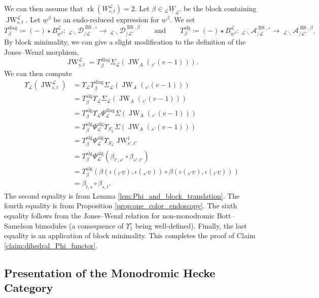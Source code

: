 \documentclass{amsart}
\newcommand{\scrL}{\mathcal{L}}
\DeclareMathOperator{\rk}{rk}
\DeclareMathOperator{\diag}{diag}
\DeclareMathOperator{\alg}{alg}
\DeclareMathOperator{\BS}{BS}
\DeclareMathOperator{\JW}{JW}
\newcommand{\EWmon}[2]{\:_{#1 \backslash} \mathcal{D}_{/ #2} }
\newcommand{\Amon}[2]{\:_{#1 \backslash} \mathcal{A}_{/ #2} }
\newcommand{\uW}[2]{{}_{#1}\underline{W}_{#2}}
\newcommand{\uw}{\underline{w}}
\theoremstyle{definition}
\numberwithin{equation}{subsection}
\begin{document}
We can then assume that $\rk (W_{s,t}^{\scrL}) = 2$. 
Let $\beta \in \uW{\scrL}{\scrL'}$ be the block containing $\JW_{s,t}^{\scrL}$.
Let $\uw^{\beta}$ be an endo-reduced expression for $w^{\beta}$. We set 
\[ T_{\beta}^{\diag} \coloneq (-) \star B_{\uw^{\beta}}^{\scrL} : \EWmon{\scrL}{\scrL}^{\BS, \circ} \to \EWmon{\scrL}{\scrL'}^{\BS, \beta} \qquad\text{and}\qquad T_{\beta}^{\alg} \coloneq (-) \star B_{\uw^{\beta}}^{\scrL} : \Amon{\scrL}{\scrL}^{\BS, \circ} \to \Amon{\scrL}{\scrL'}^{\BS, \beta}.\]
By block minimality, we can give a slight modification to the definition of the Jones--Wenzl morphism,
\[\JW_{s,t}^{\scrL} = T_{\beta}^{\diag} \Sigma_{\scrL} (\JW_A ({}_{s'} (v-1))).\]
We can then compute
\begin{align*}
    \Upsilon_{\scrL} (\JW_{s,t}^{\scrL}) &= \Upsilon_{\scrL} T_{\beta}^{\diag} \Sigma_{\scrL} (\JW_A ({}_{s'} (v-1))) \\
    &= T_{\beta}^{\alg} \Upsilon_{\scrL} \Sigma_{\scrL} (\JW_A ({}_{s'} (v-1))) \\
    &= T_{\beta}^{\alg} \Upsilon_{\scrL} \Psi_{\scrL}^{\diag} \Sigma (\JW_A ({}_{s'} (v-1))) \\
    &= T_{\beta}^{\alg} \Psi_{\scrL}^{\alg} \Upsilon_{S_{\scrL}^{\circ}} \Sigma (\JW_A ({}_{s'} (v-1))) \\ 
    &= T_{\beta}^{\alg} \Psi_{\scrL}^{\alg} \Upsilon_{S_{\scrL}^{\circ}} \JW_{s',t'}^1 \\
    &= T_{\beta}^{\alg} \Psi_{\scrL}^{\alg} (\beta_{t',s'} \circ \beta_{s', t'}) \\
    &= T_{\beta}^{\alg} (\beta (\iota ({}_{t'} \underline{v}), \iota ({}_{s'} \underline{v})) \circ \beta (\iota ({}_{s'} \underline{v}), \iota ({}_{t'} \underline{v}))) \\
    &= \beta_{t,s} \circ \beta_{s,t}.
\end{align*}
The second equality is from Lemma \ref{lem:Phi_and_block_translation}. The fourth equality is from Proposition \ref{prop:one_color_endoscopy}. The sixth equality follows from the Jones--Wenzl relation for non-monodromic Bott--Samelson bimodules (a consequence of $\Upsilon_1^{\circ}$ being well-defined).
Finally, the last equality is an application of block minimality. This completes the proof of Claim \ref{claim:dihedral_Phi_functor}.

\subsection{Presentation of the Monodromic Hecke Category}
\end{document}
